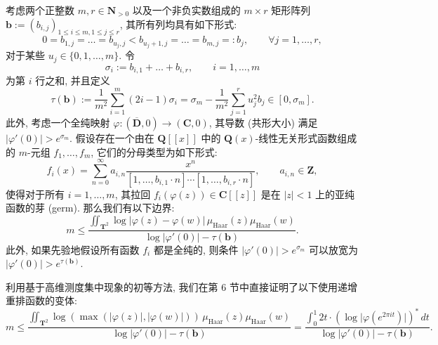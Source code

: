 \begin{theorem}\label{thm:2.5.1}
考虑两个正整数 \(m, r \in \mathbf{N}_{>0}\) 以及一个非负实数组成的 \(m \times r\) 矩形阵列 \(\mathbf{b} := (b_{i,j})_{1 \le i \le m, 1 \le j \le r}\), 其所有列均具有如下形式:
\[ 0 = b_{1,j} = \dots = b_{u_j,j} < b_{u_j+1,j} = \dots = b_{m,j} =: b_j, \qquad \forall j = 1,\dots,r, \]
对于某些 \(u_j \in \{0, 1, \dots, m\}\). 令
\[ \sigma_i := b_{i,1} + \dots + b_{i,r}, \qquad i = 1, \dots, m \]
为第 \(i\) 行之和, 并且定义
\begin{equation}\label{eq:2.5.2}
  \tau(\mathbf{b}) := \frac{1}{m^2} \sum_{i=1}^{m} (2i - 1)\sigma_i = \sigma_m - \frac{1}{m^2} \sum_{j=1}^{r} u_j^2 b_j \in [0, \sigma_m].
\end{equation}
此外, 考虑一个全纯映射 \(\varphi: (\overline{\mathbf{D}}, 0) \to (\mathbf{C}, 0)\), 其导数 (共形大小) 满足 \(\lvert\varphi'(0)\rvert > e^{\sigma_m}\).
假设存在一个由在 \(\mathbf{Q}[\! [x]\!]\) 中的 \(\mathbf{Q}(x)\)-线性无关形式函数组成的 \(m\)-元组 \(f_1, \dots, f_m\), 它们的分母类型为如下形式:
\begin{equation}\label{eq:2.5.3}
  f_i(x) = \sum_{n=0}^{\infty} a_{i,n} \frac{x^n}{[1, \dots, b_{i,1} \cdot n] \cdots [1, \dots, b_{i,r} \cdot n]}, \qquad a_{i,n} \in \mathbf{Z},
\end{equation}
使得对于所有 \(i = 1, \dots, m\), 其拉回 \(f_i(\varphi(z)) \in \mathbf{C}[\![z]\!]\) 是在 \(|z| < 1\) 上的亚纯函数的芽 (germ).
那么我们有以下边界:
\begin{equation}\label{eq:2.5.4}
  m \le \frac{\iint_{\mathbf{T}^2} \log \lvert\varphi(z) - \varphi(w)\rvert \, \mu_{\text{Haar}}(z) \mu_{\text{Haar}}(w)}{\log \lvert\varphi'(0)\rvert - \tau(\mathbf{b})}.
\end{equation}
此外, 如果先验地假设所有函数 \(f_i\) 都是全纯的, 则条件 \(\lvert\varphi'(0)\rvert > e^{\sigma_m}\) 可以放宽为 \(\lvert\varphi'(0)\rvert > e^{\tau(\mathbf{b})}\).
\end{theorem}

利用基于高维测度集中现象的初等方法, 我们在第 6 节中直接证明了以下使用递增重排函数的变体:
\begin{equation}\label{eq:2.5.5}
m \le \frac{\iint_{\mathbf{T}^2} \log \left( \max(\lvert\varphi(z)\rvert, \lvert\varphi(w)\rvert) \right) \, \mu_{\mathrm{Haar}}(z) \mu_{\mathrm{Haar}}(w)}{\log \lvert\varphi'(0)\rvert - \tau(\mathbf{b})} = \frac{\int_0^1 2t \cdot (\log \lvert\varphi(e^{2\pi it})\rvert)^* \, dt}{\log \lvert\varphi'(0)\rvert - \tau(\mathbf{b})}.
\end{equation}


